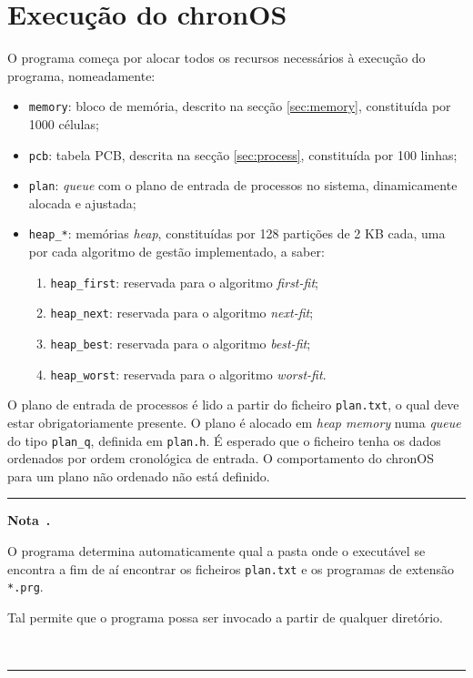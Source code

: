 \documentclass[10pt,oneside]{estiloUBI}
\newcommand{\chronOS}{\textsf{chronOS}}
\newcounter{note}
\newenvironment{note}[1][]
	{
		\medskip \refstepcounter{note} \par \medskip
		\noindent\textcolor[RGB]{220,220,220}{\rule{\linewidth}{0.4pt}}
		\noindent \textbf{Nota~\thenote. #1} \rmfamily
	}
	{
		\\ \noindent\textcolor[RGB]{220,220,220}{\rule{\linewidth}{0.4pt}} \medskip
	}
\begin{document}
	
	\chapter{Execução do \chronOS}
	\label{sec:main}
	
	O programa começa por alocar todos os recursos necessários à execução do programa, nomeadamente:
	
	\begin{itemize}
		\item \verb|memory|: bloco de memória, descrito na secção \ref{sec:memory}, constituída por 1000 células;
		\item \verb|pcb|: tabela \ac{PCB}, descrita na secção \ref{sec:process}, constituída por 100 linhas;
		\item \verb|plan|: \textit{queue} com o plano de entrada de processos no sistema, dinamicamente alocada e ajustada;
		\item \verb|heap_*|: memórias \textit{heap}, constituídas por 128 partições de 2 KB cada, uma por cada algoritmo de gestão implementado, a saber:
		\begin{enumerate}
			\item \verb|heap_first|: reservada para o algoritmo \textit{first-fit};
			\item \verb|heap_next|: reservada para o algoritmo \textit{next-fit};
			\item \verb|heap_best|: reservada para o algoritmo \textit{best-fit};
			\item \verb|heap_worst|: reservada para o algoritmo \textit{worst-fit}.
		\end{enumerate}
	\end{itemize}

	O plano de entrada de processos é lido a partir do ficheiro \texttt{plan.txt}, o qual deve estar obrigatoriamente presente. O plano é alocado em \textit{heap memory} numa \textit{queue} do tipo \verb|plan_q|, definida em \verb|plan.h|. É esperado que o ficheiro tenha os dados ordenados por ordem cronológica de entrada. O comportamento do \chronOS~ para um plano não ordenado não está definido.
	
	\begin{note}
		O programa determina automaticamente qual a pasta onde o executável se encontra a fim de aí encontrar os ficheiros \verb|plan.txt| e os programas de extensão \verb|*.prg|.

		Tal permite que o programa possa ser invocado a partir de qualquer diretório.
	\end{note}
	
\end{document}
